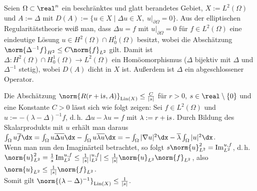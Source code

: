 \linie

\begin{Bsp}
    Seien $\Omega \subset \real^n$ ein beschränktes und glatt berandetes Gebiet,
    $X := L^2(\Omega)$ und $A := \Delta$ mit
    $D(A) := \{u \in X \;|\; \Delta u \in X,\; u|_{\partial\Omega} = 0\}$.
    Aus der elliptischen Regularitätstheorie weiß man, dass $\Delta u = f$ mit
    $u|_{\partial\Omega} = 0$ für $f \in L^2(\Omega)$ eine eindeutige Lösung
    $u \in H^2(\Omega) \cap H^1_0(\Omega)$ besitzt,
    wobei die Abschätzung $\norm{\Delta^{-1} f}_{H^2} \le C \norm{f}_{L^2}$ gilt.
    Damit ist $\Delta\colon H^2(\Omega) \cap H^1_0(\Omega) \to L^2(\Omega)$ ein
    Homöomorphismus ($\Delta$ bijektiv mit $\Delta$ und $\Delta^{-1}$ stetig),
    wobei $D(A)$ dicht in $X$ ist.
    Außerdem ist $\Delta$ ein abgeschlossener Operator.

    Die Abschätzung $\norm{R(r + \iu s, A)}_{\Lin(X)} \le \frac{C}{|s|}$
    für $r > 0$, $s \in \real \setminus \{0\}$ und eine Konstante $C > 0$
    lässt sich wie folgt zeigen:
    Sei $f \in L^2(\Omega)$ und $u := -(\lambda - \Delta)^{-1} f$, d.\,h.
    $\Delta u - \lambda u = f$ mit $\lambda := r + \mathrm{i} s$.
    Durch Bildung des Skalarprodukts mit $u$ erhält man daraus\\
    $\int_\Omega u \overline{f} \dx
    = \int_\Omega u \overline{\Delta u} \dx - \int_\Omega u \overline{\lambda u} \dx
    = -\int_\Omega |\nabla u|^2 \dx - \overline{\lambda} \int_\Omega |u|^2 \dx$.\\
    Wenn man nun den Imaginärteil betrachtet, so folgt
    $s \norm{u}_{L^2}^2 = \Im \sp{u, f}_{L^2}$, d.\,h.\\
    $\norm{u}_{L^2}^2 = \frac{1}{s} \Im \sp{u, f}_{L^2}
    \le \frac{1}{|s|} |\sp{u, f}_{L^2}|
    \le \frac{1}{|s|} \norm{u}_{L^2} \norm{f}_{L^2}$, also
    $\norm{u}_{L^2} \le \frac{1}{|s|} \norm{f}_{L^2}$.\\
    Somit gilt $\norm{(\lambda - \Delta)^{-1}}_{\Lin(X)} \le \frac{1}{|s|}$.
\end{Bsp}

\pagebreak
